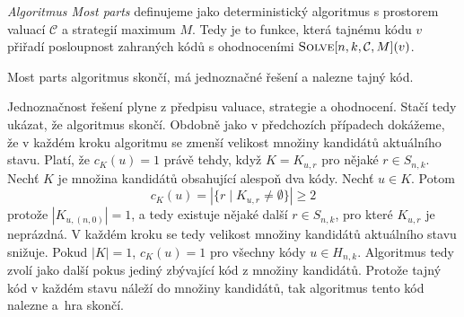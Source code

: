 \begin{definice}
    \emph{Algoritmus Most parts} definujeme jako deterministický algoritmus s prostorem valuací $\mathcal{C}$ a strategií maximum $M$. Tedy je to funkce, která tajnému kódu $v$ přiřadí posloupnost zahraných kódů s ohodnoceními $\textsc{Solve}[n, k, \mathcal{C}, M](v)$.
\end{definice}




\begin{tvrz}
    Most parts algoritmus skončí, má jednoznačné řešení a nalezne tajný kód.
\end{tvrz}
\begin{dukaz}
    Jednoznačnost řešení plyne z předpisu valuace, strategie a ohodnocení. Stačí tedy ukázat, že algoritmus skončí. Obdobně jako v předchozích případech dokážeme, že v každém kroku algoritmu se zmenší velikost množiny kandidátů aktuálního stavu. Platí, že $c_K(u) = 1$ právě tehdy, když $K = K_{u,r}$ pro nějaké $r \in S_{n,k}$. Nechť $K$ je množina kandidátů obsahující alespoň dva kódy. Nechť $u \in K$. Potom 
    \[c_K(u) = |\{r \mid K_{u,r} \neq \emptyset\}| \geq 2\]
    protože $|K_{u,(n,0)}| = 1$, a tedy existuje nějaké další $r \in S_{n,k}$, pro které $K_{u,r}$ je neprázdná. V každém kroku se tedy velikost množiny kandidátů aktuálního stavu snižuje. Pokud $|K| = 1$, $c_K(u) = 1$ pro všechny kódy $u \in H_{n,k}$. Algoritmus tedy zvolí jako další pokus jediný zbývající kód z množiny kandidátů. Protože tajný kód v každém stavu náleží do množiny kandidátů, tak algoritmus tento kód nalezne a~hra skončí.
\end{dukaz}


